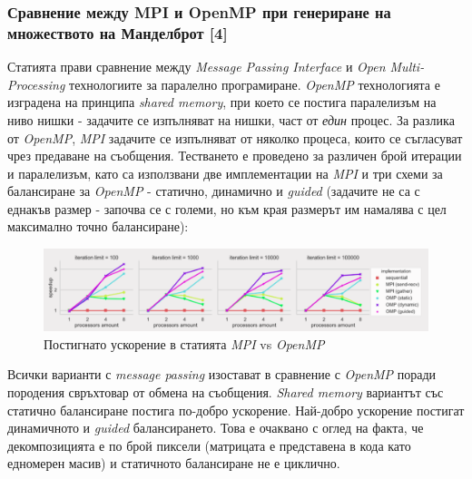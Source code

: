 \documentclass[a4paper,11pt]{article}
\begin{document}
\subsubsection{Сравнение между MPI и OpenMP при генериране на множеството на Манделброт [4] }
Статията прави сравнение между \emph{Message Passing Interface} и \emph{Open Multi-Processing} технологиите за паралелно програмиране. \emph{OpenMP} технологията е изградена на принципа \emph{shared memory}, при което се постига паралелизъм на ниво нишки - задачите се изпълняват на нишки, част от \emph{един} процес. За разлика от \emph{OpenMP}, \emph{MPI} задачите се изпълняват от няколко процеса, които се съгласуват чрез предаване на съобщения. 
Тестването е проведено за различен брой итерации и паралелизъм, като са използвани две имплементации на \emph{MPI} и три схеми за балансиране за \emph{OpenMP} - статично, динамично и \emph{guided} (задачите не са с еднакъв размер - започва се с големи, но към края размерът им намалява с цел максимално точно балансиране):
\begin{figure}[H]
    \centering
    \includegraphics[width=0.9\linewidth]{images/mpi-vs-openmp.png}
    \caption{Постигнато ускорение в статията \emph{MPI} vs \emph{OpenMP}}
    \label{fig:mpi-vs-openmp}
\end{figure}
Всички варианти с \emph{message passing} изостават в сравнение с \emph{OpenMP} поради породения свръхтовар от обмена на съобщения. \emph{Shared memory} вариантът със статично балансиране постига по-добро ускорение. Най-добро ускорение постигат динамичното и \emph{guided} балансирането. Това е очаквано с оглед на факта, че декомпозицията е по брой пиксели (матрицата е представена в кода като едномерен масив) и статичното балансиране не е циклично. 
\end{document}
